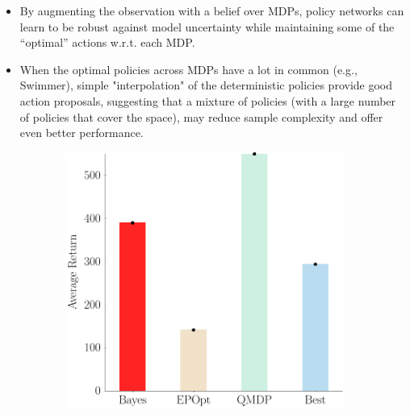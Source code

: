 \documentclass{article}
\begin{document}
\begin{itemize}
    \item By augmenting the observation with a belief over  MDPs, policy networks can learn to be robust against    model uncertainty while maintaining some of the
    ``optimal'' actions w.r.t. each MDP.
    \item When the optimal policies across MDPs have a lot in   common (e.g., Swimmer), simple "interpolation" of the deterministic policies provide good action proposals,
    suggesting that a mixture of policies (with a large number of policies that cover the space), may reduce sample complexity and offer even better performance.
\end{itemize}


\begin{figure}[t!]
\begin{centering}
\begin{subfigure}[b]{0.24\columnwidth}
\includegraphics[width=\linewidth]{figs/cheetah_nominal_comparison.pdf}
\end{subfigure}
~
\begin{subfigure}[b]{0.24\columnwidth}

\end{subfigure}
\end{centering}
\end{figure}
\end{document}
